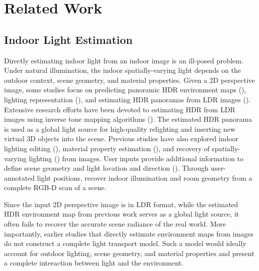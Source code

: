 \section{Related Work}
\subsection{Indoor Light Estimation}
Directly estimating indoor light from an indoor image is an ill-posed problem. Under natural illumination, the indoor spatially-varying light depends on the outdoor context,  scene geometry, and material properties. 
Given a 2D perspective image, some studies focus on predicting panoramic HDR environment maps (\cite{gardner2017learning}), lighting representation (\cite{gardner2019deep}), and estimating HDR panoramas from LDR images (\cite{gkitsas2020deep,legendre2019deeplight,gardner2017learning}). Extensive research efforts have been devoted to estimating HDR from LDR images using inverse tone mapping algorithms (\cite{rempel2007ldr2hdr,banterle2006inverse,banterle2007framework,reinhard2002photographic}). The estimated HDR panorama is used as a global light source for high-quality relighting and inserting new virtual 3D objects into the scene. Previous studies have also explored indoor lighting editing (\cite{li2022physically}), material property estimation (\cite{yeh2022photoscene}), and recovery of spatially-varying lighting (\cite{li2020inverse,garon2019fast,srinivasan2020lighthouse}) from images. User inputs provide additional information to define scene geometry and light location and direction (\cite{karsch2011rendering}). Through user-annotated light positions, \cite{zhang2016emptying} recover indoor illumination and room geometry from a complete RGB-D scan of a scene.

Since the input 2D perspective image is in LDR format, while the estimated HDR environment map from previous work serves as a global light source, it often fails to recover the accurate scene radiance of the real world. More importantly, earlier studies that directly estimate environment maps from images do not construct a complete light transport model. Such a model would ideally account for outdoor lighting, scene geometry, and material properties and present a complete interaction between light and the environment.


